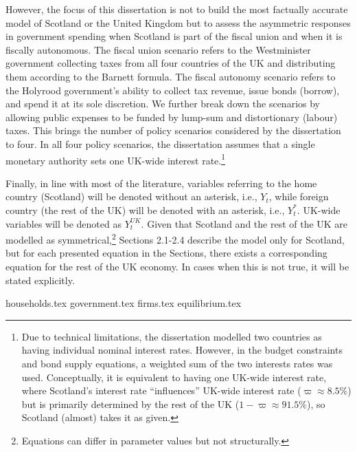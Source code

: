 However, the focus of this dissertation is not to build the most factually accurate model of Scotland or the United Kingdom but to assess the asymmetric responses in government spending when Scotland is part of the fiscal union and when it is fiscally autonomous. The fiscal union scenario refers to the Westminister government collecting taxes from all four countries of the UK and distributing them according to the Barnett formula. The fiscal autonomy scenario refers to the Holyrood government's ability to collect tax revenue, issue bonds (borrow), and spend it at its sole discretion. We further break down the scenarios by allowing public expenses to be funded by lump-sum and distortionary (labour) taxes. This brings the number of policy scenarios considered by the dissertation to four. In all four policy scenarios, the dissertation assumes that a single monetary authority sets one UK-wide interest rate.\footnote{Due to technical limitations, the dissertation modelled two countries as having individual nominal interest rates. However, in the budget constraints and bond supply equations, a weighted sum of the two interests rates was used. Conceptually, it is equivalent to having one UK-wide interest rate, where Scotland's interest rate ``influences'' UK-wide interest rate ($\varpi \approx 8.5\%$) but is primarily determined by the rest of the UK ($1-\varpi \approx 91.5\%$), so Scotland (almost) takes it as given.}

Finally, in line with most of the literature, variables referring to the home country (Scotland) will be denoted without an asterisk, i.e., $Y_t$, while foreign country (the rest of the UK) will be denoted with an asterisk, i.e., $Y^*_t$. UK-wide variables will be denoted as $Y_t^{UK}$. Given that Scotland and the rest of the UK are modelled as symmetrical,\footnote{Equations can differ in parameter values but not structurally.} Sections 2.1-2.4 describe the model only for Scotland, but for each presented equation in the Sections, there exists a corresponding equation for the rest of the UK economy. In cases when this is not true, it will be stated explicitly.

\newpage
{households.tex}
\newpage
{government.tex}
\newpage
{firms.tex}
\newpage
{equilibrium.tex}
